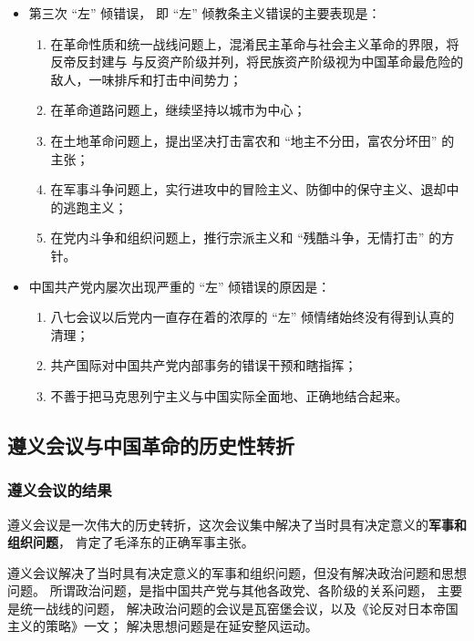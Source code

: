\documentclass[10pt, UTF8]{book} %
\begin{document}
\begin{itemize}[itemsep=0pt]
    \item 第三次 “左” 倾错误， 即 “左” 倾教条主义错误的主要表现是：
    \begin{enumerate}[itemsep=0pt, label={(\arabic*)}]
        \item 在革命性质和统一战线问题上，混淆民主革命与社会主义革命的界限，将反帝反封建与
        与反资产阶级并列，将民族资产阶级视为中国革命最危险的敌人，一味排斥和打击中间势力；
        \item 在革命道路问题上，继续坚持以城市为中心；
        \item 在土地革命问题上，提出坚决打击富农和 “地主不分田，富农分坏田” 的主张；
        \item 在军事斗争问题上，实行进攻中的冒险主义、防御中的保守主义、退却中的逃跑主义；
        \item 在党内斗争和组织问题上，推行宗派主义和 “残酷斗争，无情打击” 的方针。
    \end{enumerate}
    \item 中国共产党内屡次出现严重的 “左” 倾错误的原因是：
    \begin{enumerate}[itemsep=0pt, label={(\arabic*)}]
        \item 八七会议以后党内一直存在着的浓厚的 “左” 倾情绪始终没有得到认真的清理；
        \item 共产国际对中国共产党内部事务的错误干预和瞎指挥；
        \item 不善于把马克思列宁主义与中国实际全面地、正确地结合起来。
    \end{enumerate}
\end{itemize}

\subsection{遵义会议与中国革命的历史性转折}

\subsubsection{遵义会议的结果}

遵义会议是一次伟大的历史转折，这次会议集中解决了当时具有决定意义的\textbf{军事和组织问题}，
肯定了毛泽东的正确军事主张。
\begin{remark}
    遵义会议解决了当时具有决定意义的军事和组织问题，但没有解决政治问题和思想问题。
    所谓政治问题，是指中国共产党与其他各政党、各阶级的关系问题，
    主要是统一战线的问题，
    解决政治问题的会议是瓦窑堡会议，以及《论反对日本帝国主义的策略》一文；
    解决思想问题是在延安整风运动。
\end{remark}
\end{document}
